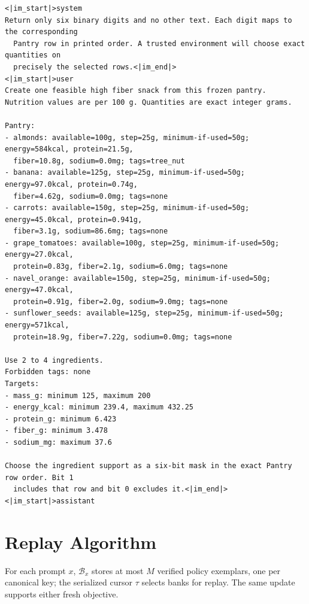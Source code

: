 \documentclass{article}
\newcommand{\1}{\mathbf 1}
\theoremstyle{remark}
\theoremstyle{definition}
\theoremstyle{plain}
\begin{document}
\begin{Verbatim}[fontsize=\scriptsize,frame=single,framesep=4pt,rulecolor=\color{black!25}]
<|im_start|>system
Return only six binary digits and no other text. Each digit maps to the corresponding
  Pantry row in printed order. A trusted environment will choose exact quantities on
  precisely the selected rows.<|im_end|>
<|im_start|>user
Create one feasible high fiber snack from this frozen pantry.
Nutrition values are per 100 g. Quantities are exact integer grams.

Pantry:
- almonds: available=100g, step=25g, minimum-if-used=50g; energy=584kcal, protein=21.5g,
  fiber=10.8g, sodium=0.0mg; tags=tree_nut
- banana: available=125g, step=25g, minimum-if-used=50g; energy=97.0kcal, protein=0.74g,
  fiber=4.62g, sodium=0.0mg; tags=none
- carrots: available=150g, step=25g, minimum-if-used=50g; energy=45.0kcal, protein=0.941g,
  fiber=3.1g, sodium=86.6mg; tags=none
- grape_tomatoes: available=100g, step=25g, minimum-if-used=50g; energy=27.0kcal,
  protein=0.83g, fiber=2.1g, sodium=6.0mg; tags=none
- navel_orange: available=150g, step=25g, minimum-if-used=50g; energy=47.0kcal,
  protein=0.91g, fiber=2.0g, sodium=9.0mg; tags=none
- sunflower_seeds: available=125g, step=25g, minimum-if-used=50g; energy=571kcal,
  protein=18.9g, fiber=7.22g, sodium=0.0mg; tags=none

Use 2 to 4 ingredients.
Forbidden tags: none
Targets:
- mass_g: minimum 125, maximum 200
- energy_kcal: minimum 239.4, maximum 432.25
- protein_g: minimum 6.423
- fiber_g: minimum 3.478
- sodium_mg: maximum 37.6

Choose the ingredient support as a six-bit mask in the exact Pantry row order. Bit 1
  includes that row and bit 0 excludes it.<|im_end|>
<|im_start|>assistant
\end{Verbatim}



\section{Replay Algorithm}
\label{app:algorithm}
\label{app:replay-objective}

For each prompt $x$, $\mathcal B_x$ stores at most $M$ verified policy
exemplars, one per canonical key; the serialized cursor $\tau$ selects
banks for replay. The same update supports either fresh objective.
\end{document}
